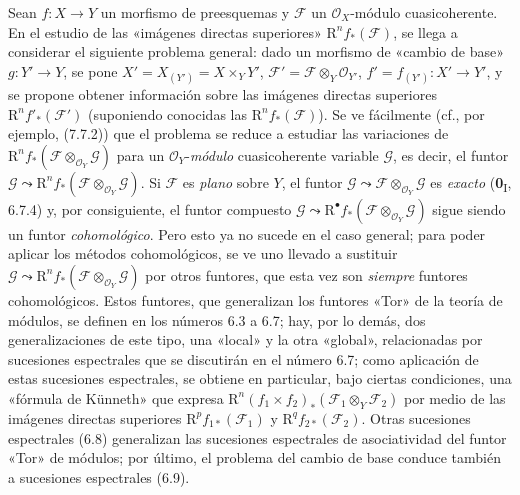 \begin{env}[6.1.1]
\label{III.6.1.1}
Sean $f:X\to Y$ un morfismo de preesquemas y $\mathscr F$ un
$\mathscr O_X$-módulo cuasicoherente. En el estudio de las «imágenes
directas superiores» $\mathrm R^n f_*(\mathscr F)$, se llega a considerar el
siguiente problema general: dado un morfismo de «cambio de base»
$g:Y'\to Y$, se pone
$X'=X_{(Y')}=X\times_Y Y'$, $\mathscr F'=\mathscr F\otimes_Y\mathscr O_{Y'}$, $f'=f_{(Y')}:X'\to Y'$,
y se propone obtener información sobre las imágenes directas
superiores $\mathrm R^n f'_*(\mathscr F')$ (suponiendo conocidas las
$\mathrm R^n f_*(\mathscr F)$). Se ve fácilmente (cf., por ejemplo, (7.7.2))
que el problema se reduce a estudiar las variaciones de
$\mathrm R^n f_*(\mathscr F\otimes_{\mathscr O_Y}\mathscr G)$ para un
$\mathscr O_Y$-\emph{módulo} cuasicoherente variable $\mathscr G$, es decir, el
funtor
$\mathscr G\leadsto\mathrm R^n f_*(\mathscr F\otimes_{\mathscr O_Y}\mathscr G)$.
Si $\mathscr F$ es \emph{plano} sobre $Y$, el funtor
$\mathscr G\leadsto\mathscr F\otimes_{\mathscr O_Y}\mathscr G$ es \emph{exacto}
(\textbf{0}\textsubscript{I}, 6.7.4) y, por consiguiente, el funtor compuesto
$\mathscr G\leadsto\mathrm R^\bullet f_*(\mathscr F\otimes_{\mathscr O_Y}\mathscr G)$
sigue siendo un funtor \emph{cohomológico}. Pero esto ya no sucede en el caso
general; para poder aplicar los métodos cohomológicos, se ve uno llevado a
sustituir
$\mathscr G\leadsto\mathrm R^n f_*(\mathscr F\otimes_{\mathscr O_Y}\mathscr G)$
por otros funtores, que esta vez son \emph{siempre} funtores cohomológicos. Estos
funtores, que generalizan los funtores «Tor» de la teoría de módulos, se
definen en los números 6.3 a 6.7; hay, por lo demás, dos generalizaciones de
este tipo, una «local» y la otra «global», relacionadas por sucesiones
espectrales que se discutirán en el número 6.7; como aplicación de estas
sucesiones espectrales, se obtiene en particular, bajo ciertas condiciones,
una «fórmula de Künneth» que expresa
$\mathrm R^n(f_1\times f_2)_*(\mathscr F_1\otimes_Y\mathscr F_2)$
por medio de las imágenes directas superiores
$\mathrm R^p f_{1*}(\mathscr F_1)$ y $\mathrm R^q f_{2*}(\mathscr F_2)$.
Otras sucesiones espectrales (6.8) generalizan las sucesiones espectrales de
asociatividad del funtor «Tor» de módulos; por último, el problema del cambio
de base conduce también a sucesiones espectrales (6.9).
\end{env}

